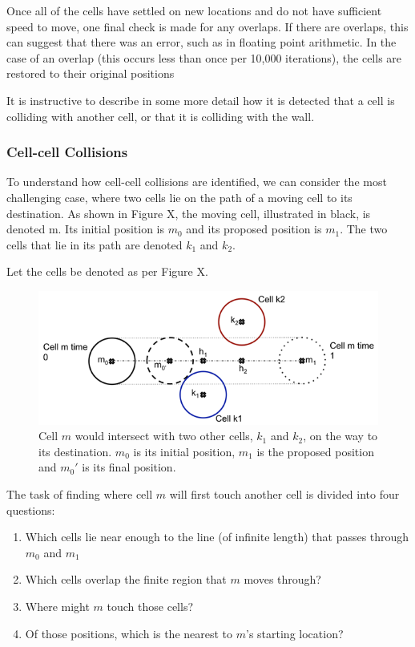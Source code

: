 \documentclass[12pt]{article}
\begin{document}
Once all of the cells have settled on new locations and do not have 
sufficient speed to move, one final check is made for any overlaps. If 
there are overlaps, this can suggest that there was an error, such as in 
floating point arithmetic. In the case of an overlap (this occurs less 
than once per 10,000 iterations), the cells are restored to their 
original positions

It is instructive to describe in some more detail how it is detected 
that a cell is colliding with another cell, or that it is colliding with 
the wall.

\subsubsection{Cell-cell Collisions}
To understand how cell-cell collisions are identified, we can consider 
the most challenging case, where two cells lie on the path of a moving 
cell to its destination. As shown in Figure X, the moving cell, 
illustrated in black, is denoted m. Its initial position is \(m_0\) 
and its proposed position is \(m_1\). The two cells that lie in its 
path are denoted \(k_1\) and \(k_2\).

Let the cells be denoted as per Figure X.

\begin{figure}[H]
\centering
\includegraphics[width=\textwidth]{media/collision.png}
\caption{Cell \(m\) would intersect with two other 
  cells, \(k_1\) and \(k_2\), on the way to its destination. 
  \(m_0\) is its initial position, \(m_1\) is the proposed position and 
\(m_0'\) is its final position.}
\end{figure}

The task of finding where cell \(m\) will first touch another 
cell is divided into four questions:

\begin{enumerate}
\item Which cells lie near enough to the line (of infinite length) that 
passes through \(m_0\) and \(m_1\)
\item Which cells overlap the finite region that \(m\) moves 
through?
\item Where might \(m\) touch those cells?
\item Of those positions, which is the nearest to \(m\)'s 
starting location?
\end{enumerate}
\end{document}
